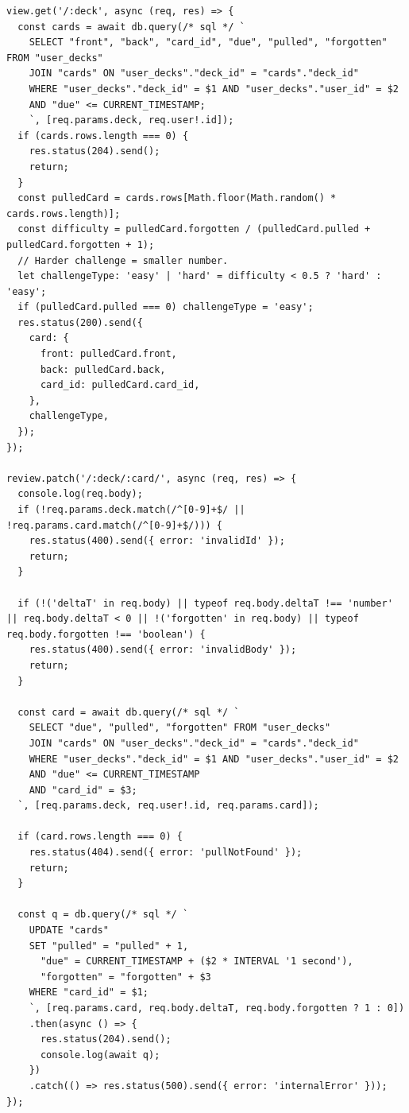 \documentclass{report}
\begin{document}
\begin{verbatim}
view.get('/:deck', async (req, res) => {
  const cards = await db.query(/* sql */ `
    SELECT "front", "back", "card_id", "due", "pulled", "forgotten" FROM "user_decks"
    JOIN "cards" ON "user_decks"."deck_id" = "cards"."deck_id"
    WHERE "user_decks"."deck_id" = $1 AND "user_decks"."user_id" = $2
    AND "due" <= CURRENT_TIMESTAMP;
    `, [req.params.deck, req.user!.id]);
  if (cards.rows.length === 0) {
    res.status(204).send();
    return;
  }
  const pulledCard = cards.rows[Math.floor(Math.random() * cards.rows.length)];
  const difficulty = pulledCard.forgotten / (pulledCard.pulled + pulledCard.forgotten + 1);
  // Harder challenge = smaller number.
  let challengeType: 'easy' | 'hard' = difficulty < 0.5 ? 'hard' : 'easy';
  if (pulledCard.pulled === 0) challengeType = 'easy';
  res.status(200).send({
    card: {
      front: pulledCard.front,
      back: pulledCard.back,
      card_id: pulledCard.card_id,
    },
    challengeType,
  });
});

review.patch('/:deck/:card/', async (req, res) => {
  console.log(req.body);
  if (!req.params.deck.match(/^[0-9]+$/ || !req.params.card.match(/^[0-9]+$/))) {
    res.status(400).send({ error: 'invalidId' });
    return;
  }

  if (!('deltaT' in req.body) || typeof req.body.deltaT !== 'number' || req.body.deltaT < 0 || !('forgotten' in req.body) || typeof req.body.forgotten !== 'boolean') {
    res.status(400).send({ error: 'invalidBody' });
    return;
  }

  const card = await db.query(/* sql */ `
    SELECT "due", "pulled", "forgotten" FROM "user_decks"
    JOIN "cards" ON "user_decks"."deck_id" = "cards"."deck_id"
    WHERE "user_decks"."deck_id" = $1 AND "user_decks"."user_id" = $2
    AND "due" <= CURRENT_TIMESTAMP
    AND "card_id" = $3;
  `, [req.params.deck, req.user!.id, req.params.card]);

  if (card.rows.length === 0) {
    res.status(404).send({ error: 'pullNotFound' });
    return;
  }

  const q = db.query(/* sql */ `
    UPDATE "cards"
    SET "pulled" = "pulled" + 1,
      "due" = CURRENT_TIMESTAMP + ($2 * INTERVAL '1 second'),
      "forgotten" = "forgotten" + $3
    WHERE "card_id" = $1;
    `, [req.params.card, req.body.deltaT, req.body.forgotten ? 1 : 0])
    .then(async () => {
      res.status(204).send();
      console.log(await q);
    })
    .catch(() => res.status(500).send({ error: 'internalError' }));
});
\end{verbatim}
\end{document}
